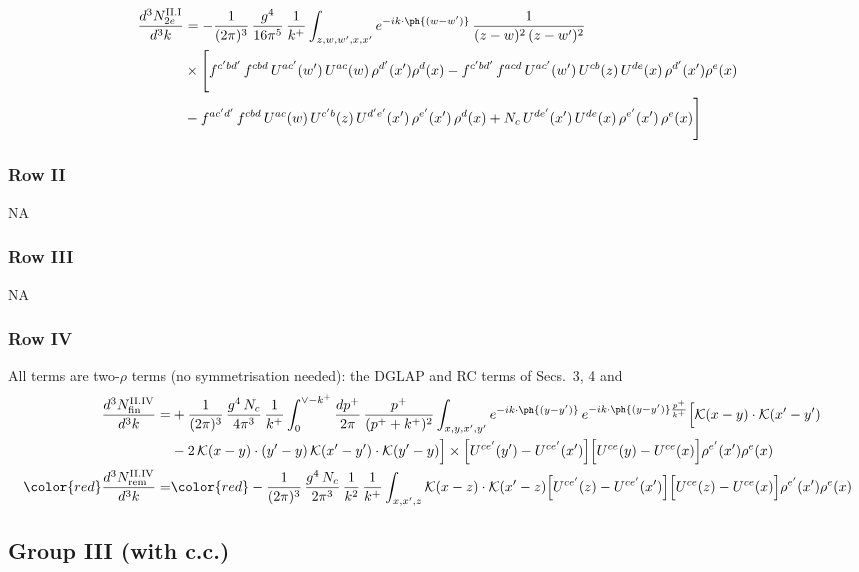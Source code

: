 \begin{align}
\frac{d^{3}N^{\rm II.I}_{2e}}{d^{3}k}&= -\frac{1}{(2\pi)^{3}}\,\frac{g^{4}}{16\pi^{5}}\,\frac{1}{k^{+}}\int_{z,w,w^{\prime},x,x^{\prime}}e^{-ik\cdot\ph{(w-w^{\prime})}}\,\frac{1}{(z-w)^{2}\,(z-w^{\prime})^{2}}\notag\\
&\times\Bigg[f^{c^{\prime}bd^{\prime}}\,f^{cbd}\, U^{ac^{\prime}}(w^{\prime})\,U^{ac}(w)\,\rho^{d^{\prime}}(x^{\prime})\rho^{d}(x)- f^{c^{\prime}bd^{\prime}}\,f^{acd}\,U^{ac^{\prime}}(w^{\prime})\,U^{cb}(z)\,U^{de}(x)\,\rho^{d^{\prime}}(x^{\prime})\rho^{e}(x) \notag \\ & -f^{ac^{\prime}d^{\prime}}\,f^{cbd}\,U^{ac}(w)\,U^{c^{\prime}b}(z)\,U^{d^{\prime}e^{\prime}}(x^{\prime})\,\rho^{e^{\prime}}(x^{\prime})\,\rho^{d}(x) +N_{c}\,U^{de^{\prime}}(x^{\prime})\,U^{de}(x)\,\rho^{e^{\prime}}(x^{\prime})\,\rho^{e}(x)\Bigg]\notag
\end{align}
\subsubsection*{Row II}
\textsc{NA}
\subsubsection*{Row III}
\textsc{NA}
\subsubsection*{Row IV}
All terms are two-$\rho$ terms (no symmetrisation needed): the DGLAP and RC terms of Secs.~3, 4 and
\begin{align}
\frac{d^{3}N^{\rm II.IV}_{\rm fin}}{d^{3}k}= &  +\frac{1}{(2\pi)^{3}}\,\frac{g^{4}\,N_{c}}{4\pi^{3}}\,\frac{1}{k^{+}}\int_{0}^{\vee-k^{+}}\frac{dp^{+}}{2\pi}\,\frac{p^{+}}{(p^{+}+k^{+})^{2}}\int_{x,y,x',y'}e^{-ik\cdot\ph{(y-y')}}\,e^{-ik\cdot\ph{(y-y')}\frac{p^{+}}{k^{+}}}\Big[\mathcal{K}(x-y)\cdot\mathcal{K}(x'-y')\notag \\ & -2\,\mathcal{K}(x-y)\cdot(y'-y)\,\mathcal{K}(x'-y')\cdot\mathcal{K}(y'-y)\Big]\times\Big[U^{ce'}(y') - U^{ce'}(x')\Big]\Big[U^{ce}(y) - U^{ce}(x)\Big]\rho^{e'}(x')\rho^{e}(x)\label{eq:D-II.IV}\\
{\color{red}\frac{d^{3}N^{\rm II.IV}_{\rm rem}}{d^{3}k}}=&{\color{red}-\frac{1}{(2\pi)^{3}}\,\frac{g^{4}\,N_{c}}{2\pi^{3}}\,\frac{1}{k^{2}}\,\frac{1}{k^{+}}\int_{x,x',z}\mathcal{K}(x-z)\cdot\mathcal{K}(x'-z)\Big[U^{ce'}(z)-U^{ce'}(x')\Big]\Big[U^{ce}(z)-U^{ce}(x)\Big]\rho^{e'}(x')\rho^{e}(x)}\label{eq:D-II.IVrem}
\end{align}
\subsection{Group III (with c.c.)}
